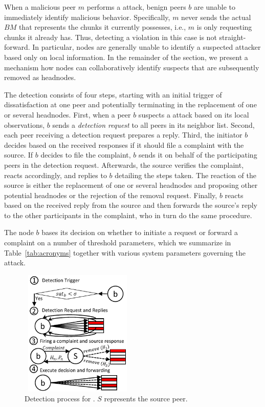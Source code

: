 When a malicious peer $m$ performs a \drop attack, benign peers $b$ are unable to immediately identify malicious behavior.
Specifically, $m$ never sends the actual $BM$ that represents the chunks it currently possesses, i.e., $m$ is only requesting chunks it already has. 
Thus, detecting a violation in this case is not straight-forward. In particular, nodes are generally unable to identify a suspected attacker based only on local information.
In the remainder of the section, we present a mechanism how nodes can collaboratively identify suspects that are subsequently removed as headnodes.  


The detection consists of four steps, starting with an initial trigger of dissatisfaction at one peer and potentially terminating in the replacement of one or several headnodes. 
First, when a peer $b$ suspects a \drop attack based on its local observations, $b$ sends a \emph{detection request} to all peers in its neighbor list.
Second, each peer receiving a detection request prepares a reply. 
Third, the initiator $b$ decides based on the received responses if it should file a complaint with the source.
If $b$ decides to file the complaint, $b$ sends it on behalf of the participating peers in the detection request. 
Afterwards, the source verifies the complaint, reacts accordingly, and replies to $b$ detailing the steps taken. 
The reaction of the source is either the replacement of one or several headnodes and proposing other potential headnodes or the rejection of the removal request.
Finally, $b$ reacts based on the received reply from the source and then forwards the source's reply to the other participants in the complaint, who in turn do the same procedure. 

The node $b$ bases its decision on whether to initiate a request or forward a complaint on a number of threshold parameters, which we summarize in Table~\ref{tab:acronyms} together with various system parameters governing the attack. 




\begin{figure}
 \centering
 \includegraphics[width=5.5cm,height=6cm]{./Figures/detection.pdf}
  \caption{Detection process for \drop. $S$ represents the source peer.}
\label{detection-blocks} 
\end{figure}

